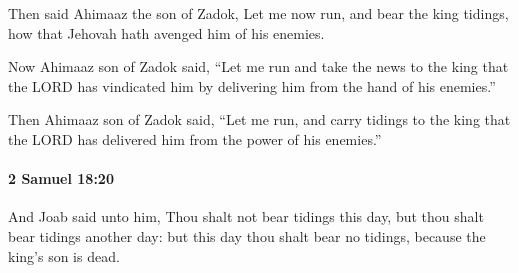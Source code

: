			\begin{versebox}
					\item[BHS] 
					\item[ASV] Then said Ahimaaz the son of Zadok, Let me now run, and bear the king tidings, how that Jehovah hath avenged him of his enemies.
					\item[NIV] Now Ahimaaz son of Zadok said, “Let me run and take the news to the king that the LORD has vindicated him by delivering him from the hand of his enemies.”
					\item[NRSV] Then Ahimaaz son of Zadok said, “Let me run, and carry tidings to the king that the LORD has delivered him from the power of his enemies.”
			\end{versebox}

		\paragraph{2 Samuel 18:20} %
			\label{2SAMUEL-18-20}

			And Joab said unto him, Thou shalt not bear tidings this day, but thou shalt bear tidings another day: but this day thou shalt bear no tidings, because the king’s son is dead.

